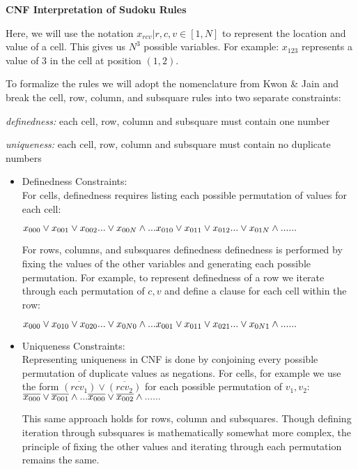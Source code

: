 \documentclass[11pt]{article}
\begin{document}
\textbf{CNF Interpretation of Sudoku Rules}

Here, we will use the notation $x_{rcv} | r,c,v \in [1, N]$ to represent the location and value of a cell. This gives us $N^3$ possible variables. For example: $x_{123}$ represents a value of 3 in the cell at position $(1,2)$.

To formalize the rules we will adopt the nomenclature from Kwon \& Jain\cite{sudokusat} and break the cell, row, column, and subsquare rules into two separate constraints: 

\textit{definedness:} each cell, row, column and subsquare must contain one number

\textit{uniqueness:} each cell, row, column and subsquare must contain no duplicate numbers

\begin{itemize}

\item Definedness Constraints:\\
For cells, definedness requires listing each possible permutation of values for each cell: 

$
x_{000} \vee x_{001} \vee x_{002} ... \vee x_{00N} \wedge ... \\
x_{010} \vee x_{011} \vee x_{012} ... \vee x_{01N} \wedge ... \\
...
$

For rows, columns, and subsquares definedness definedness is performed by fixing the values of the other variables and generating each possible permutation. For example, to represent definedness of a row we iterate through each permutation of $c,v$ and define a clause for each cell within the row:

$
x_{000} \vee x_{010} \vee x_{020} ... \vee x_{0N0} \wedge ... \\
x_{001} \vee x_{011} \vee x_{021} ... \vee x_{0N1} \wedge ... \\
...
$


\item Uniqueness Constraints:\\
Representing uniqueness in CNF is done by conjoining every possible permutation of duplicate values as negations. 
For cells, for example we use the form $\overline{(rcv_1)} \vee \overline{(rcv_2)}$ for each possible permutation of $v_1, v_2$:\\
$
\overline{x_{000}} \vee \overline{x_{001}} \wedge ... \\
\overline{x_{000}} \vee \overline{x_{002}} \wedge ... \\
...
$

This same approach holds for rows, column and subsquares. Though defining iteration through subsquares is mathematically somewhat more complex, the principle of fixing the other values and iterating through each permutation remains the same.

\end{itemize}
\end{document}
